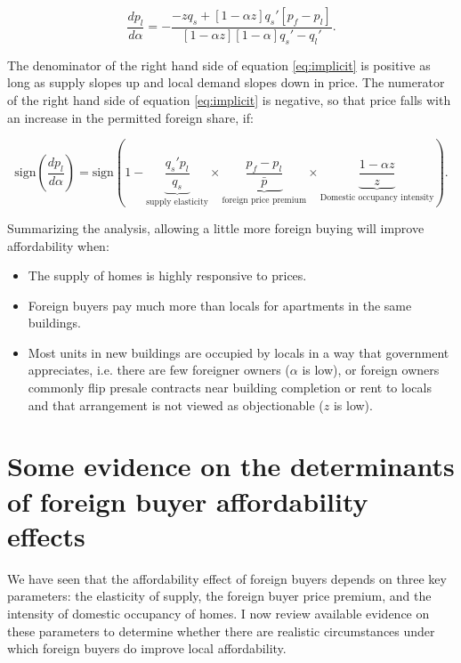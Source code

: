 \documentclass[12pt]{article}
\begin{document}
\begin{equation} 
	\label{eq:implicit} 
	\frac{dp_{l}}{d\alpha} = -\frac{-zq_{s} + \left[1-\alpha z\right]q_{s}'\left[p_{f}-p_{l}\right]}{\left[1-\alpha
z\right]\left[1-\alpha\right]q_{s}'-q_{l}'}.  
\end{equation}

The denominator of the right hand side of equation \eqref{eq:implicit} is positive as long as supply slopes up and local demand slopes down in price. The numerator of the right hand side of equation \eqref{eq:implicit} is negative, so that price falls with an increase in the permitted foreign share, if:

\begin{equation}
	\label{eq:sign}
	\text{sign}\left(\frac{dp_{l}}{d\alpha}\right) = \text{sign}\left(1-\underbrace{\frac{q_{s}'p_{l}}{q_{s}}}_{\text{supply elasticity}}\times\underbrace{\frac{p_{f}-p_{l}}{\bar{p}}}_{\text{foreign price premium}}\times\underbrace{\frac{1-\alpha z}{z}}_{\text{Domestic occupancy intensity}}\right).
\end{equation}

Summarizing the analysis, allowing a little more foreign buying will improve affordability when:

\begin{itemize}
	\item The supply of homes is highly responsive to prices.
	\item Foreign buyers pay much more than locals for apartments in the same buildings.
	\item Most units in new buildings are occupied by locals in a way that government appreciates, i.e. there are few foreigner owners ($\alpha$ is low), or foreign owners commonly flip presale contracts near building completion or rent to locals and that arrangement is not viewed as objectionable ($z$ is low).
\end{itemize}

\section{\label{sec:data} Some evidence on the determinants of foreign buyer affordability effects}

We have seen that the affordability effect of foreign buyers depends on three
key parameters: the elasticity of supply, the foreign buyer price premium, and
the intensity of domestic occupancy of homes. I now review available evidence
on these parameters to determine whether there are realistic circumstances
under which foreign buyers do improve local affordability.
\end{document}
